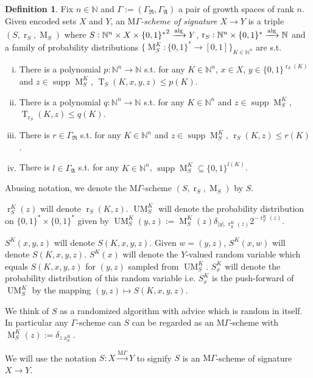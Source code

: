 \documentclass{article}
\numberwithin{equation}{section}
\theoremstyle{definition}
\newtheorem{definition}{Definition}[section]
\theoremstyle{plain}
\newcommand{\Words}{{\{ 0, 1 \}^*}}
\newcommand{\WordsLen}[1]{{\{ 0, 1 \}^{#1}}}
\DeclareMathOperator{\Supp}{supp}
\DeclareMathOperator{\T}{T}
\DeclareMathOperator{\R}{r}
\DeclareMathOperator{\A}{a}
\DeclareMathOperator{\M}{M}
\DeclareMathOperator{\UM}{UM}
\newcommand{\Nats}{\mathbb{N}}
\newcommand{\Abs}[1]{\lvert #1 \rvert}
\newcommand{\GrowR}{\Gamma_{\mathfrak{R}}}
\newcommand{\GrowA}{\Gamma_{\mathfrak{A}}}
\newcommand{\Grow}{\Gamma:=(\GrowR,\GrowA)}
\newcommand{\MGrow}{\mathrm{M}\Gamma}
\newcommand{\Alg}{\xrightarrow{\textnormal{alg}}}
\newcommand{\MScheme}{\xrightarrow{\MGrow}}
\begin{document}
\begin{definition}

Fix $n \in \Nats$ and $\Grow$ a pair of growth spaces of rank $n$. Given encoded sets $X$ and $Y$, an \emph{$\MGrow$-scheme of signature $X \rightarrow Y$} is a triple $(S,\R_S,\M_S)$ where $S: \Nats^n \times X \times \Words^2 \Alg Y$, $\R_S: \Nats^n \times \Words \Alg \Nats$ and a family of probability distributions $\{\M_S^K: \Words \rightarrow [0,1]\}_{K \in \Nats^n}$ are s.t.

\begin{enumerate}[(i)]

\item There is a polynomial $p: \Nats^n \rightarrow \Nats$ s.t. for any $K \in \Nats^n$, $x \in X$, ${y \in \WordsLen{\R_S(K)}}$ and $z \in \Supp \M_S^K$, $\T_S(K,x,y,z) \leq p(K)$.

\item There is a polynomial $q: \Nats^n \rightarrow \Nats$ s.t. for any $K \in \Nats^n$ and $z \in \Supp \M_S^K$, ${\T_{\R_S}(K,z) \leq q(K)}$.

\item There is $r \in \GrowR$ s.t. for any $K \in \Nats^n$ and $z \in \Supp \M_S^K$, $\R_S(K,z) \leq r(K)$.

\item There is $l \in \GrowA$ s.t. for any $K \in \Nats^n$, $\Supp \M_S^K \subseteq \WordsLen{l(K)}$.

\end{enumerate}

Abusing notation, we denote the $\MGrow$-scheme $(S,\R_S,\M_S)$ by $S$.

$\R_S^K(z)$ will denote $\R_S(K,z)$. $\UM_S^K$ will denote the probability distribution on ${\Words \times \Words}$ given by $\UM_S^K(y,z):= \M_S^K(z) \delta_{\Abs{y},\R_S^K(z)} 2^{-\R_S^K(z)}$.

$S^K(x,y,z)$ will denote $S(K,x,y,z)$. Given $w=(y,z)$, $S^K(x,w)$ will denote $S(K,x,y,z)$. $S^K(x)$ will denote the $Y$-valued random variable which equals $S(K,x,y,z)$ for $(y,z)$ sampled from $\UM_S^K$. $S_x^K$ will denote the probability distribution of this random variable i.e. $S_x^K$ is the push-forward of $\UM_S^K$ by the mapping $(y,z) \mapsto S(K,x,y,z)$.

We think of $S$ as a randomized algorithm with advice which is random in itself. In particular any $\Gamma$-scheme can $S$ can be regarded as an $\MGrow$-scheme with $\M_S^K(z):=\delta_{z\A_S^K}$.

We will use the notation $S: X \MScheme Y$ to signify $S$ is an $\MGrow$-scheme of signature $X \rightarrow Y$.

\end{definition}
\end{document}
